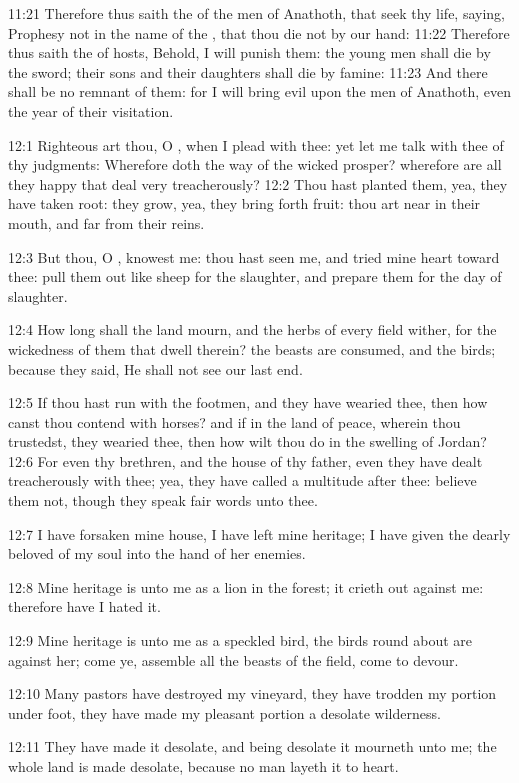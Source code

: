 11:21 Therefore thus saith the \LORD of the men of Anathoth, that seek
thy life, saying, Prophesy not in the name of the \LORD, that thou die
not by our hand: 11:22 Therefore thus saith the \LORD of hosts, Behold,
I will punish them: the young men shall die by the sword; their sons
and their daughters shall die by famine: 11:23 And there shall be no
remnant of them: for I will bring evil upon the men of Anathoth, even
the year of their visitation.

12:1 Righteous art thou, O \LORD, when I plead with thee: yet let me
talk with thee of thy judgments: Wherefore doth the way of the wicked
prosper?  wherefore are all they happy that deal very treacherously?
12:2 Thou hast planted them, yea, they have taken root: they grow,
yea, they bring forth fruit: thou art near in their mouth, and far
from their reins.

12:3 But thou, O \LORD, knowest me: thou hast seen me, and tried mine
heart toward thee: pull them out like sheep for the slaughter, and
prepare them for the day of slaughter.

12:4 How long shall the land mourn, and the herbs of every field
wither, for the wickedness of them that dwell therein? the beasts are
consumed, and the birds; because they said, He shall not see our last
end.

12:5 If thou hast run with the footmen, and they have wearied thee,
then how canst thou contend with horses? and if in the land of peace,
wherein thou trustedst, they wearied thee, then how wilt thou do in
the swelling of Jordan?  12:6 For even thy brethren, and the house of
thy father, even they have dealt treacherously with thee; yea, they
have called a multitude after thee: believe them not, though they
speak fair words unto thee.

12:7 I have forsaken mine house, I have left mine heritage; I have
given the dearly beloved of my soul into the hand of her enemies.

12:8 Mine heritage is unto me as a lion in the forest; it crieth out
against me: therefore have I hated it.

12:9 Mine heritage is unto me as a speckled bird, the birds round
about are against her; come ye, assemble all the beasts of the field,
come to devour.

12:10 Many pastors have destroyed my vineyard, they have trodden my
portion under foot, they have made my pleasant portion a desolate
wilderness.

12:11 They have made it desolate, and being desolate it mourneth unto
me; the whole land is made desolate, because no man layeth it to
heart.

